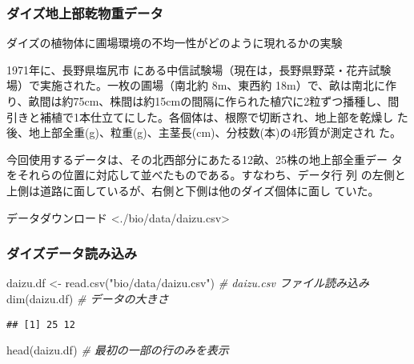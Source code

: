 \documentclass[
]{article}
\author{}
\date{\vspace{-2.5em}}
\newenvironment{Shaded}{\begin{snugshade}}{\end{snugshade}}
\newcommand{\CommentTok}[1]{\textcolor[rgb]{0.56,0.35,0.01}{\textit{#1}}}
\newcommand{\FunctionTok}[1]{\textcolor[rgb]{0.00,0.00,0.00}{#1}}
\newcommand{\NormalTok}[1]{#1}
\newcommand{\OtherTok}[1]{\textcolor[rgb]{0.56,0.35,0.01}{#1}}
\newcommand{\StringTok}[1]{\textcolor[rgb]{0.31,0.60,0.02}{#1}}
\begin{document}
\hypertarget{ux30c0ux30a4ux30baux5730ux4e0aux90e8ux4e7eux7269ux91cdux30c7ux30fcux30bf}{%
\subsubsection{ダイズ地上部乾物重データ}\label{ux30c0ux30a4ux30baux5730ux4e0aux90e8ux4e7eux7269ux91cdux30c7ux30fcux30bf}}

ダイズの植物体に圃場環境の不均一性がどのように現れるかの実験

1971年に、長野県塩尻市 にある中信試験場（現在は，長野県野菜・花卉試験
場）で実施された。一枚の圃場（南北約 8m、東西約 18m）で、畝は南北に作
り、畝間は約75cm、株間は約15cmの間隔に作られた植穴に2粒ずつ播種し、間
引きと補植で1本仕立てにした。各個体は、根際で切断され、地上部を乾燥し
た後、地上部全重(g)、粒重(g)、主茎長(cm)、分枝数(本)の4形質が測定され
た。

今回使用するデータは、その北西部分にあたる12畝、25株の地上部全重デー
タをそれらの位置に対応して並べたものである。すなわち、データ行 列
の左側と上側は道路に面しているが、右側と下側は他のダイズ個体に面し
ていた。

データダウンロード \textless./bio/data/daizu.csv\textgreater{}

\hypertarget{ux30c0ux30a4ux30baux30c7ux30fcux30bfux8aadux307fux8fbcux307f}{%
\subsubsection{ダイズデータ読み込み}\label{ux30c0ux30a4ux30baux30c7ux30fcux30bfux8aadux307fux8fbcux307f}}

\begin{Shaded}
\begin{Highlighting}[]
\NormalTok{    daizu.df }\OtherTok{\textless{}{-}} \FunctionTok{read.csv}\NormalTok{(}\StringTok{"bio/data/daizu.csv"}\NormalTok{)     }\CommentTok{\# daizu.csv ファイル読み込み}
    \FunctionTok{dim}\NormalTok{(daizu.df)                }\CommentTok{\# データの大きさ}
\end{Highlighting}
\end{Shaded}

\begin{verbatim}
## [1] 25 12
\end{verbatim}

\begin{Shaded}
\begin{Highlighting}[]
    \FunctionTok{head}\NormalTok{(daizu.df)               }\CommentTok{\# 最初の一部の行のみを表示}
\end{Highlighting}
\end{Shaded}
\end{document}
